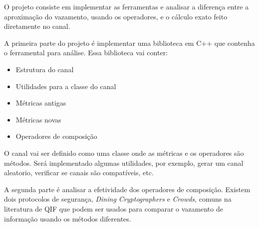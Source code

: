 %
%
%
%

O projeto consiste em implementar as ferramentas e analisar a diferença entre a aproximação do vazamento, usando os operadores, e o cálculo exato feito diretamente no canal.

A primeira parte do projeto é implementar uma biblioteca em C++ que contenha o ferramental para análise. Essa biblioteca vai conter:

\begin{itemize}
  \item{Estrutura do canal}
  \item{Utilidades para a classe do canal}
  \item{Métricas antigas}
  \item{Métricas novas}
  \item{Operadores de composição}
\end{itemize}

O canal vai ser definido como uma classe onde as métricas e os operadores são métodos. 
Será implementado algumas utilidades, por exemplo, gerar um canal aleatorio, verificar se canais são compatíveis, etc.

A segunda parte é analisar a efetividade dos operadores de composição.
Existem dois protocolos de segurança, \emph{Dining Cryptographers} e \emph{Crowds}, comuns na literatura de QIF que podem ser usados para comparar o vazamento de informação usando os métodos diferentes.
